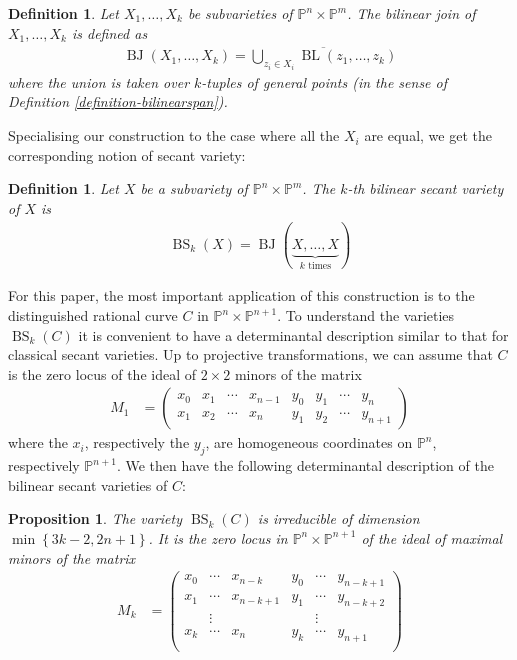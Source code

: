 \documentclass[a4paper,11pt]{article}
\newtheorem{proposition}[theorem]{Proposition}
\newtheorem{definition}[theorem]{Definition}
\newcommand{\PP}{\mathbb P}
\newcommand{\BL}{\operatorname{BL}}
\newcommand{\BJ}{\operatorname{BJ}}
\newcommand{\BS}{\operatorname{BS}}
\newcommand{\ourproduct}{\mathbb P^n \times \mathbb P^{n+1}}
\begin{document}
  \begin{definition}
    Let $X_1,\ldots,X_k$ be subvarieties of $\PP^n \times \PP^m$. The \emph{bilinear join} of $X_1,\ldots,X_k$ is defined as
    \begin{align*}
      \BJ(X_1,\ldots,X_k) = \overline{\bigcup_{z_i \in X_i} \BL(z_1,\ldots,z_k)}
    \end{align*}
    where the union is taken over $k$-tuples of general points (in the sense of Definition \ref{definition-bilinearspan}). 
  \end{definition}
Specialising our construction to the case where all the $X_i$ are equal, we get the corresponding notion of secant variety:
  \begin{definition}
    Let $X$ be a subvariety of $\PP^n \times \PP^m$. The \emph{$k$-th bilinear secant variety of $X$} is
    \begin{align*}
      \BS_k(X) = \BJ(\underbrace{X,\ldots,X}_{k \text{ times}} )
    \end{align*}
  \end{definition}
For this paper, the most important application of this construction is to the distinguished rational curve $C$ in $\ourproduct$. To understand the varieties $\BS_k(C)$ it is convenient to have a determinantal description similar to that for classical secant varieties. Up to projective transformations, we can assume that $C$ is the zero locus of the ideal of $2 \times 2$ minors of the matrix
  \begin{align}\label{eqn-M1}
    M_1 &=
    \begin{pmatrix}
      x_0 & x_1 & \cdots & x_{n-1} & y_0 & y_1 &\cdots & y_n \\
      x_1 & x_2 & \cdots & x_n & y_1 & y_2 & \cdots &y_{n+1}
    \end{pmatrix} \tag{$\ast$}
  \end{align}
where the $x_i$, respectively the $y_j$, are homogeneous coordinates on $\PP^n$, respectively $\PP^{n+1}$. We then have the following determinantal description of the bilinear secant varieties of $C$: 
  \begin{proposition}\label{proposition-bilinearsecantdim}
    The variety $\BS_k(C)$ is irreducible of dimension $\min \left\{ 3k-2, 2n+1 \right\}$. It is the zero locus in $\ourproduct$ of the ideal of maximal minors of the matrix 
    \begin{align*} \label{eqn-M2}
M_k &=
      \begin{pmatrix}
        x_0 & \cdots & x_{n-k} & y_0 & \cdots & y_{n-k+1} \\
        x_1 & \cdots & x_{n-k+1} & y_1 & \cdots & y_{n-k+2} \\
        & \vdots & & & \vdots & \\
        x_k & \cdots & x_n & y_k & \cdots & y_{n+1}\\
             \end{pmatrix} \tag{$\ast \ast$}
    \end{align*}
  \end{proposition} 
\end{document}
